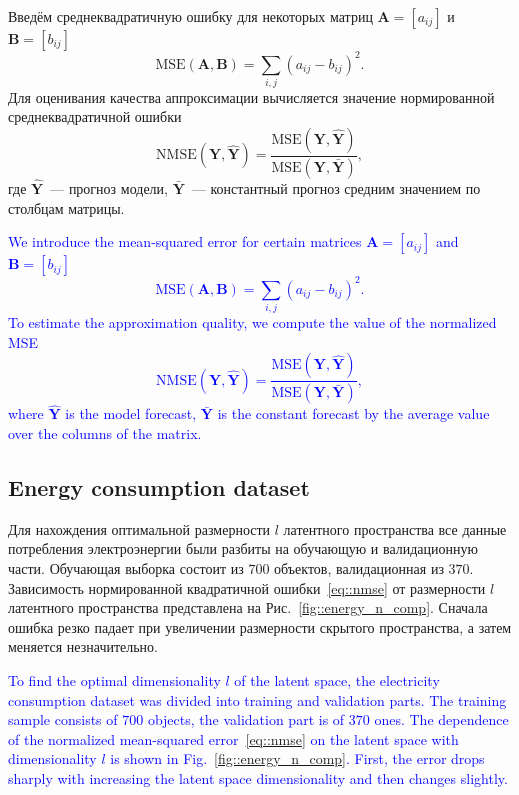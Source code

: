 \documentclass[12pt,twoside]{article}
\newcommand{\bY}{\mathbf{Y}}
\begin{document}
Введём среднеквадратичную ошибку для некоторых матриц $\mathbf{A} = [a_{ij}]$ и $\mathbf{B} = [b_{ij}]$
\[
\text{MSE} (\mathbf{A}, \mathbf{B}) = \sum_{i,j} (a_{ij} - b_{ij})^2.
\]
Для оценивания качества аппроксимации вычисляется значение нормированной среднеквадратичной ошибки
\begin{equation}
\text{NMSE}(\bY,  \mathbf{\hat{Y}}) = \frac{\text{MSE} (\bY, \mathbf{\hat{Y}})}{\text{MSE} (\bY, \mathbf{\bar{Y}})},
\label{eq::nmse}
\end{equation}
где $\mathbf{\hat{Y}}$~--- прогноз модели, $\mathbf{\bar{Y}}$~--- константный прогноз средним значением по столбцам матрицы.

\textcolor{blue}{
We introduce the mean-squared error for certain matrices $\mathbf{A} = [a_{ij}]$ and $\mathbf{B} = [b_{ij}]$ 
\[
\text{MSE} (\mathbf{A}, \mathbf{B}) = \sum_{i,j} (a_{ij} - b_{ij})^2.
\]
To estimate the approximation quality, we compute the value of the normalized MSE 
\begin{equation}
\text{NMSE}(\bY,  \mathbf{\hat{Y}}) = \frac{\text{MSE} (\bY, \mathbf{\hat{Y}})}{\text{MSE} (\bY, \mathbf{\bar{Y}})},
\label{eq::nmse}
\end{equation}
where $\mathbf{\hat{Y}}$ is the model forecast, $\mathbf{\bar{Y}}$ is the constant forecast by the average value over the columns of the matrix.}

\subsection{Energy consumption dataset}

Для нахождения оптимальной размерности $l$ латентного пространства все данные потребления электроэнергии были разбиты на обучающую и валидационную части. 
Обучающая выборка состоит из $700$ объектов, валидационная из $370$. Зависимость нормированной квадратичной ошибки~\eqref{eq::nmse} от размерности $l$ латентного пространства представлена на Рис.~\ref{fig::energy_n_comp}. 
Сначала ошибка резко падает при увеличении размерности скрытого пространства, а затем меняется незначительно.

\textcolor{blue}{
To find the optimal dimensionality $l$ of the latent space, the electricity consumption dataset was divided into training and validation parts. 
The training sample consists of $700$ objects, the validation part is of $370$ ones. The dependence of the normalized mean-squared error~\eqref{eq::nmse} on the latent space with dimensionality $l$ is shown in Fig.~\ref{fig::energy_n_comp}. 
First, the error drops sharply with increasing the latent space dimensionality and then changes slightly.}
\end{document}
